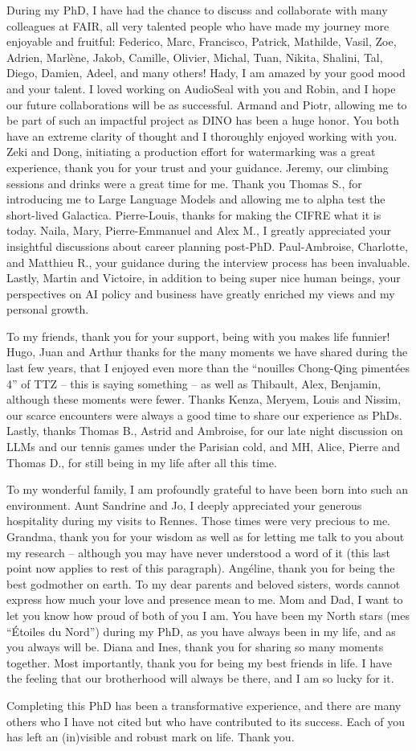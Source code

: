 During my PhD, I have had the chance to discuss and collaborate with many colleagues at FAIR, all very talented people who have made my journey more enjoyable and fruitful: 
Federico, Marc, Francisco, Patrick, Mathilde, Vasil, Zoe, Adrien, Marl\`ene, Jakob, Camille, Olivier, Michal, Tuan, Nikita, Shalini, Tal, Diego, Damien, Adeel, and many others!
Hady, I am amazed by your good mood and your talent. 
I loved working on AudioSeal with you and Robin, and I hope our future collaborations will be as successful.
Armand and Piotr, allowing me to be part of such an impactful project as DINO has been a huge honor. 
You both have an extreme clarity of thought and I thoroughly enjoyed working with you.
Zeki and Dong, initiating a production effort for watermarking was a great experience, thank you for your trust and your guidance.
Jeremy, our climbing sessions and drinks were a great time for me.
Thank you Thomas S., for introducing me to Large Language Models and allowing me to alpha test the short-lived Galactica. 
Pierre-Louis, thanks for making the CIFRE what it is today. 
Naila, Mary, Pierre-Emmanuel and Alex M., I greatly appreciated your insightful discussions about career planning post-PhD. 
Paul-Ambroise, Charlotte, and Matthieu R., your guidance during the interview process has been invaluable.
Lastly, Martin and Victoire, in addition to being super nice human beings, your perspectives on AI policy and business have greatly enriched my views and my personal growth.

To my friends, thank you for your support, being with you makes life funnier!
Hugo, Juan and Arthur thanks for the many moments we have shared during the last few years, that I enjoyed even more than the ``nouilles Chong-Qing piment\'ees 4'' of TTZ -- this is saying something -- as well as Thibault, Alex, Benjamin, although these moments were fewer.
Thanks Kenza, Meryem, Louis and Nissim, our scarce encounters were always a good time to share our experience as PhDs.
Lastly, thanks Thomas B., Astrid and Ambroise, for our late night discussion on LLMs and our tennis games under the Parisian cold, and MH, Alice, Pierre and Thomas D., for still being in my life after all this time.

To my wonderful family, I am profoundly grateful to have been born into such an environment. 
Aunt Sandrine and Jo, I deeply appreciated your generous hospitality during my visits to Rennes.
Those times were very precious to me.
Grandma, thank you for your wisdom as well as for letting me talk to you about my research -- although you may have never understood a word of it (this last point now applies to rest of this paragraph).
Ang\'eline, thank you for being the best godmother on earth.
To my dear parents and beloved sisters, words cannot express how much your love and presence mean to me. 
Mom and Dad, I want to let you know how proud of both of you I am. 
You have been my North stars (mes ``\'Etoiles du Nord'') during my PhD, as you have always been in my life, and as you always will be.
Diana and Ines, thank you for sharing so many moments together. 
Most importantly, thank you for being my best friends in life.
I have the feeling that our brotherhood will always be there, and I am so lucky for it.

Completing this PhD has been a transformative experience, and there are many others who I have not cited but who have contributed to its success.
Each of you has left an (in)visible and robust mark on life. Thank you.
